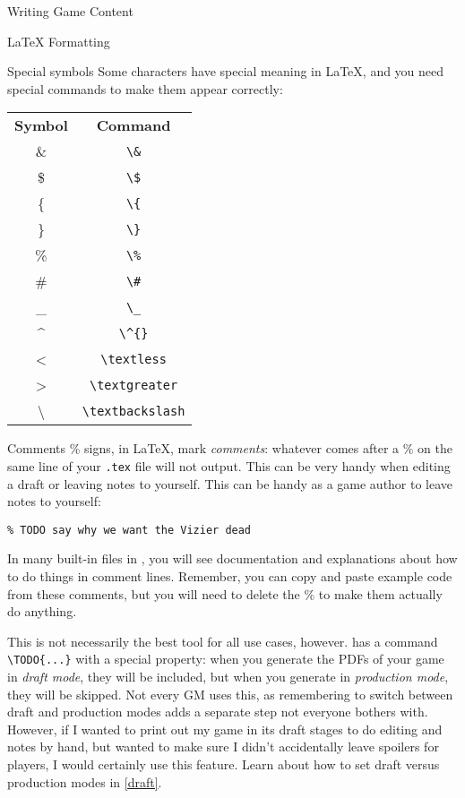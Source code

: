 \documentclass[sheet]{GameTexBase}
\begin{document}
\begin{section}{Writing Game Content}
\begin{subsection}{\LaTeX{} Formatting}
\begin{subsubsection}{Special symbols}
Some characters have special meaning in \LaTeX{}, and you need special commands to make them appear correctly:

\begin{center}
\begin{tabular}{c c}
 \textbf{Symbol} & \textbf{Command} \\
 \& & \lstinline|\&| \\
 \$ & \lstinline|\$| \\
 \{ & \lstinline|\{| \\
 \} & \lstinline|\}| \\
 \% & \lstinline|\%| \\
 \# & \lstinline|\#| \\
 \_ & \lstinline|\_| \\
 \^{} & \lstinline|\^{}| \\
 \textless & \lstinline|\textless| \\
 \textgreater & \lstinline|\textgreater| \\
 \textbackslash & \lstinline|\textbackslash|
\end{tabular}
\end{center}
\end{subsubsection}
\begin{subsubsection}{Comments}
\% signs, in \LaTeX{}, mark \textit{comments}: whatever comes after a \% on the same line of your \texttt{.tex} file will not output.  This can be very handy when editing a draft or leaving notes to yourself.
This can be handy as a game author to leave notes to yourself:
\begin{verbatim}
% TODO say why we want the Vizier dead
\end{verbatim}
In many built-in files in \gametex{}, you will see documentation and explanations about how to do things in comment lines.  Remember, you can copy and paste example code from these comments, but you will need to delete the \% to make them actually do anything.

This is not necessarily the best tool for all use cases, however.  \gametex{} has a command \lstinline|\TODO{...}| with a special property: when you generate the PDFs of your game in \emph{draft mode}, they will be included, but when you generate in \emph{production mode}, they will be skipped.  Not every GM uses this, as remembering to switch between draft and production modes adds a separate step not everyone bothers with.  However, if I wanted to print out my game in its draft stages to do editing and notes by hand, but wanted to make sure I didn't accidentally leave spoilers for players, I would certainly use this feature.  Learn about how to set draft versus production modes in \ref{draft}.
\end{subsubsection}


\end{subsection}
\end{section}
\end{document}
